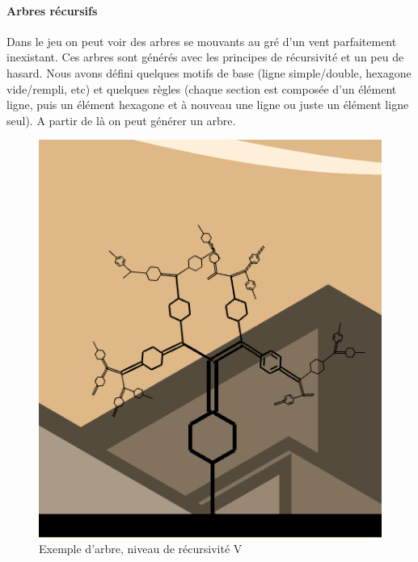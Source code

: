 \documentclass[a4paper,10pt]{article}
\begin{document}
  \paragraph{Arbres récursifs}
  Dans le jeu on peut voir des arbres se mouvants au gré d'un vent parfaitement inexistant. Ces arbres sont générés avec les principes de récursivité et un peu de hasard. Nous avons défini quelques motifs de base (ligne simple/double, hexagone vide/rempli, etc) et quelques règles (chaque section est composée d'un élément ligne, puis un élément hexagone et à nouveau une ligne ou juste un élément ligne seul). A partir de là on peut générer un arbre.
  
 \begin{figure}[!h]
 \centering
 \vspace{-10pt}
 \includegraphics[scale=0.4]{images/tree}
 \caption{Exemple d'arbre, niveau de récursivité V}
 \end{figure}
 
\end{document}
